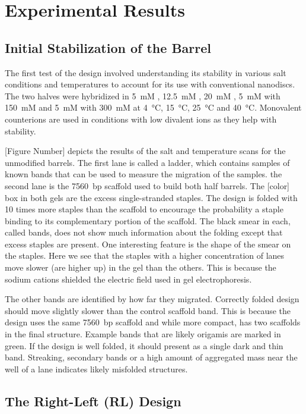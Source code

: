 
\chapter{Experimental Results}
\label{ch:experimental-results}


\section{Initial Stabilization of the Barrel}
\label{sec:init-stabilization}
The first test of the design involved understanding its stability in various salt conditions and temperatures to account for its use with conventional nanodiscs. The two halves were hybridized in \qty{5}{mM} , \qty{12.5}{mM} , \qty{20}{mM} , \qty{5}{mM}  with \qty{150}{mM}  and \qty{5}{mM}  with \qty{300}{mM}  at \qty{4}{\celsius}, \qty{15}{\celsius}, \qty{25}{\celsius} and \qty{40}{\celsius}. Monovalent counterions are used in conditions with low divalent ions as they help with stability.

[Figure Number] depicts the results of the salt and temperature scans for the unmodified barrels. The first lane is called a ladder, which contains samples of known bands that can be used to measure the migration of the samples. the second lane is the \qty{7560}{bp} scaffold used to build both half barrels. The [color] box in both gels are the excess single-stranded staples. The design is folded with 10 times more staples than the scaffold to encourage the probability a staple binding to its complementary portion of the scaffold. The black smear in each, called bands, does not show much information about the folding except that excess staples are present. One interesting feature is the shape of the smear on the staples. Here we see that the staples with a higher concentration of  lanes move slower (are higher up) in the gel than the others. This is because the sodium cations shielded the electric field used in gel electrophoresis.

The other bands are identified by how far they migrated. Correctly folded design should move slightly slower than the control scaffold band. This is because the design uses the same \qty{7560}{bp} scaffold and while more compact, has two scaffolds in the final structure. Example bands that are likely origamis are marked in green. If the design is well folded, it should present as a single dark and thin band. Streaking, secondary bands or a high amount of aggregated mass near the well of a lane indicates likely misfolded structures.

\section{The Right-Left (RL) Design}
\label{sec:right-left-design}
